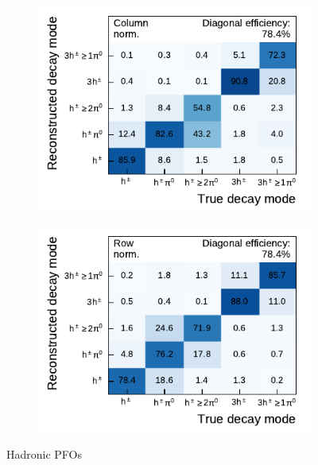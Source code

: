 \begin{figure}[htb]
  \begin{subfigure}[t]{0.48\textwidth}
    \centering
    \includegraphics{./figures/decay_mode_classification/experiments/mig_mat_hadronic_pfos.pdf}
  \end{subfigure}\hfill
  \begin{subfigure}[t]{0.48\textwidth}
    \centering
    \includegraphics{./figures/decay_mode_classification/experiments/comp_mat_hadronic_pfos.pdf}
  \end{subfigure}
  \caption{Hadronic PFOs}
\end{figure}

